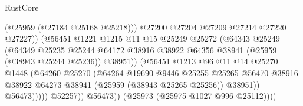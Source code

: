 \begin{lexlean}{RustCore}
\begin{coremodule}
                                            (@25959 (@27184 @25168 @25218)))
                                          @27200
                                          @27204
                                          @27209
                                          @27214
                                          @27220
                                          @27227))
                                      (@56451
                                        @1221
                                        @1215
                                        @11
                                        @15
                                        @25249
                                        @25272
                                        (@64343
                                          @25249
                                          (@64349
                                            @25235
                                            @25244
                                            @64172
                                            @38916
                                            @38922
                                            @64356
                                            @38941
                                            (@25959 (@38943 @25244 @25236))
                                            @38951))
                                        (@56451
                                          @1213
                                          @96
                                          @11
                                          @14
                                          @25270
                                          @1448
                                          (@64260
                                            @25270
                                            (@64264
                                              @19690
                                              @9446
                                              @25255
                                              @25265
                                              @56470
                                              @38916
                                              @38922
                                              @64273
                                              @38941
                                              (@25959 (@38943 @25265 @25256))
                                              @38951))
                                          @56473)))))
                                @52257))
                            @56473))
                        (@25973 (@25975 @1027 @996 @25112))))

\end{coremodule}
\end{lexlean}
